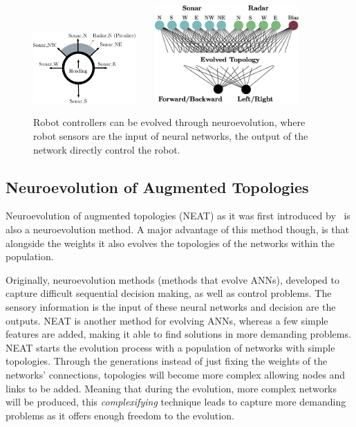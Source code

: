 \begin{figure}[t!]
\centering
\includegraphics[width=0.35\textwidth]{../Figures/Misc/RobotMaze.eps}\  \    \  \    
\includegraphics[width=0.49\textwidth]{../Figures/Misc/RobotMazeNetwork.eps}
\caption{Robot controllers can be evolved through neuroevolution, where robot sensors are the input of neural networks, the output of the network directly control the robot.}
\label{fig:robotExample}
\end{figure}


\subsection{Neuroevolution of Augmented Topologies}
\label{NEAT}

Neuroevolution of augmented topologies (NEAT) as it was first introduced by~\citep{stanley2002evolving} is also a neuroevolution method. A major advantage of this method though, is that alongside the weights it also evolves the topologies of the networks within the population.

Originally, neuroevolution methods (methods that evolve ANNs), developed to capture difficult sequential decision making, as well as control problems. The sensory information is the input of these neural networks and decision are the outputs. NEAT is another method for evolving ANNs, whereas a few simple features are added, making it able to find solutions in more demanding problems. NEAT starts the evolution process with a population of networks with simple topologies. Through the generations instead of just fixing the weights of the networks' connections, topologies will become more complex allowing nodes and links to be added. Meaning that during the evolution, more complex networks will be produced, this \emph{complexifying} technique leads to capture more demanding problems as it offers enough freedom to the evolution.

